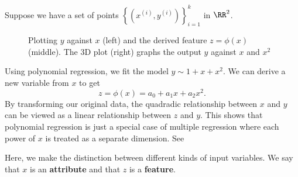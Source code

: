 Suppose we have a set of points \(\left\{\left(x^{(i)}, y^{(i)}\right)\right\}_{i=1}^{k}\) in \(\RR^2\).
\begin{figure}
    \centering
    
    \caption{Plotting \(y\) against \(x\) (left) and the derived feature \(z = \phi(x)\) (middle). The 3D plot (right) graphs the output \(y\) against \(x\) and \(x^2\)}
    \label{fig:feature-map}
\end{figure}
Using polynomial regression, we fit the model \(y \sim 1 + x + x^2\).
We can derive a new variable from \(x\) to get \[z = \phi(x) = a_0 + a_1 x + a_2 x^2.\]
By transforming our original data, the quadradic relationship between \(x\) and \(y\) can be viewed as a linear relationship between \(z\) and \(y\).
This shows that polynomial regression is just a special case of multiple regression where each power of \(x\) is treated as a separate dimension.
See 

Here, we make the distinction between different kinds of input variables.
We say that \(x\) is an \textbf{attribute} and that \(z\) is a \textbf{feature}.